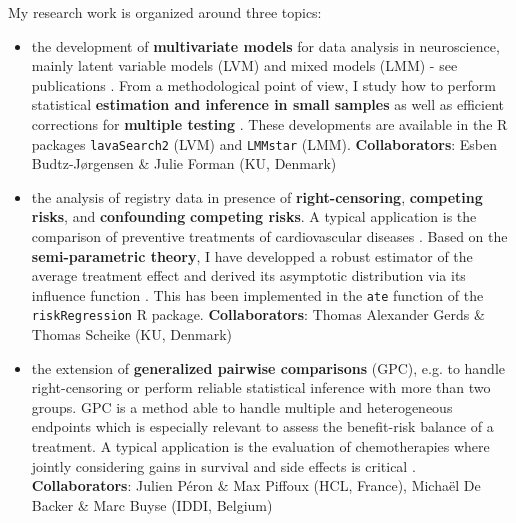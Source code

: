 \documentclass[12pt]{article}
\begin{document}
\bigskip

My research work is organized around three topics:
\begin{itemize}
\item the development of \textbf{multivariate models} for data analysis in
neuroscience, mainly latent variable models (LVM) and mixed models (LMM) - see publications
\cite{ebert2019molecular,stenbaek2017brain,fisher2017bdnf}. From a
methodological point of view, I study how to perform statistical
\textbf{estimation and inference in small samples} \citep{ozenne2020small} as
well as efficient corrections for \textbf{multiple testing}
\citep{ozenne2022controlling}. These developments are available in the
R packages \texttt{lavaSearch2} (LVM) and \texttt{LMMstar} (LMM). \newline
\textbf{Collaborators}: Esben Budtz-Jørgensen \& Julie Forman (KU, Denmark)

\item the analysis of registry data in presence of \textbf{right-censoring},
\textbf{competing risks}, and \textbf{confounding} \textbf{competing risks}. A typical
application is the comparison of preventive treatments of
cardiovascular diseases
\citep{staerk2016ischaemic,staerk2017resumption,staerk2018standard}. Based
on the \textbf{semi-parametric theory}, I have developped a robust
estimator of the average treatment effect and derived its asymptotic
distribution via its influence function
\citep{ozenne2020estimation}. This has been implemented in the \texttt{ate}
function of the \texttt{riskRegression} R package. \newline
\textbf{Collaborators}: Thomas Alexander Gerds \& Thomas Scheike (KU, Denmark)
\end{itemize}

\clearpage

\begin{itemize}
\item the extension of \textbf{generalized pairwise comparisons} (GPC), e.g. to
handle right-censoring \citep{ozenne2021asymptotic} or perform
reliable statistical inference with more than two groups. GPC is a
method able to handle multiple and heterogeneous endpoints which is
especially relevant to assess the benefit-risk balance of a
treatment. A typical application is the evaluation of chemotherapies
where jointly considering gains in survival and side effects is
critical \citep{peron2016net,peron2016assessment}. \newline
\textbf{Collaborators}: Julien Péron \& Max Piffoux (HCL, France), \newline
\hphantom{*Collaborators*:} Michaël De Backer \& Marc Buyse (IDDI,
Belgium)
\end{itemize}
\end{document}

